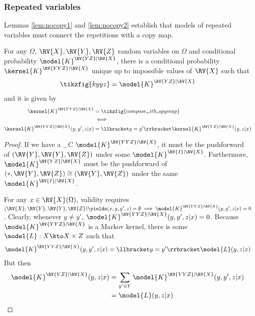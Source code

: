 \subsubsection{Repeated variables}

Lemmas \ref{lem:nocopy1} and \ref{lem:nocopy2} establish that models of repeated variables must connect the repetitions with a copy map.

\begin{lemma}\label{lem:nocopy1}
For any $\Omega$, $\RV{X},\RV{Y},\RV{Z}$ random variables on $\Omega$ and conditional probability $\model{K}^{\RV{YZ}|\RV{X}}$, there is a conditional probability $\kernel{K}^{\RV{YYZ}|\RV{X}}$ unique up to impossible values of $\RV{X}$ such that
\begin{align}
    \tikzfig{kyyz} = \model{K}^{\RV{YZ}|\RV{X}}
\end{align}
and it is given by
\begin{align}
        \kernel{K}^{\RV{YYZ}|\RV{X}} &= \tikzfig{compose_with_copymap}\\
        &\iff \\
        \kernel{K}^{\RV{YYZ}|\RV{X}}(y,y',z|x) &= \llbracket y=y' \rrbracket\kernel{K}^{\RV{YZ}|\RV{X}}(y,z|x)\\
\end{align}
\end{lemma}

\begin{proof}
If we have a _C $\model{K}^{\RV{YYZ}|\RV{X}}$, it must be the pushforward of $(\RV{Y},\RV{Y},\RV{Z})$ under some $\model{K}^{\RV{I}|\RV{X}}$. Furthermore, $\model{K}^{\RV{YZ}|\RV{X}}$ must be the pushforward of $(*,\RV{Y},\RV{Z})\cong (\RV{Y},\RV{Z})$ under the same $\model{K}^{\RV{I}|\RV{X}}$.

For any $x\in \RV{X}(\Omega)$, validity requires $(\RV{X},\RV{Y},\RV{Y},\RV{Z})\yields (x,y,y',z)=\emptyset \implies \model{K}^{\RV{YYZ}|\RV{X}}(y,y',z|x)=0$. Clearly, whenever $y\neq y'$, $\model{K}^{\RV{YYZ}|\RV{X}}(y,y',z|x)=0$. Because $\model{K}^{\RV{YYZ}|\RV{X}}$ is a Markov kernel, there is some $\model{L}:X\kto X\times Z$ such that
\begin{align}
    \model{K}^{\RV{YYZ}|\RV{X}}(y,y',z|x) = \llbracket y=y' \rrbracket \model{L}(y,z|x)\\
\end{align}
But then
\begin{align}
    \model{K}^{\RV{YZ}|\RV{X}}(y,z|x) &= \sum_{y'\in Y} \model{K}^{\RV{YYZ}|\RV{X}}(y,y',z|x)\\
    &= \model{L}(y,z|x)\\
\end{align}
\end{proof}

